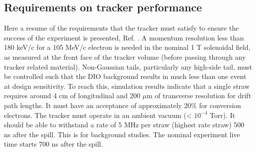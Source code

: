 \subsection{Requirements on tracker performance}
Here a resume of the requirements that the tracker must satisfy to ensure the 
success of the experiment is presented, Ref. \cite{trkreq}.
A momentum resolution less than 180 keV/c for a 105 MeV/c electron is needed in the nominal
1 T solenoidal field, as measured at the front face of the tracker volume (before
passing through any tracker related material). Non-Gaussian tails, particularly any
high-side tail, must be controlled such that the DIO background results in much less
than one event at design sensitivity. To reach this, simulation results indicate that 
a single straw requires around 4 cm of longitudinal and 200 $\mu$m of transverse 
resolution for drift path lengths. 
It must have an acceptance of approximately 20\% for conversion electrons.
The tracker must operate in an ambient vacuum (< $10^{-4}$ Torr).
It should be able to withstand a rate of 5 MHz per straw (highest rate straw) 
500 ns after the spill. This is
for background studies. The nominal experiment live time starts 700 ns after the spill.
